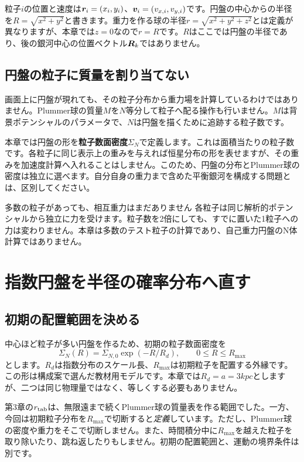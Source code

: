 粒子$i$の位置と速度は$\boldsymbol r_i=(x_i,y_i)$、$\boldsymbol v_i=(v_{x,i},v_{y,i})$です。円盤の中心からの半径を$R=\sqrt{x^2+y^2}$と書きます。重力を作る球の半径$r=\sqrt{x^2+y^2+z^2}$とは定義が異なりますが、本章では$z=0$なので$r=R$です。$R$はここでは円盤の半径であり、後の銀河中心の位置ベクトル$\boldsymbol R_k$ではありません。

\subsection{円盤の粒子に質量を割り当てない}
画面上に円盤が現れても、その粒子分布から重力場を計算しているわけではありません。Plummer球の質量$M$を$N$等分して粒子へ配る操作も行いません。$M$は背景ポテンシャルのパラメータで、$N$は円盤を描くために追跡する粒子数です。

本章では円盤の形を\textbf{粒子数面密度}$\Sigma_N$で定義します。これは面積当たりの粒子数です。各粒子に同じ表示上の重みを与えれば恒星分布の形を表せますが、その重みを加速度計算へ入れることはしません。このため、円盤の分布とPlummer球の密度は独立に選べます。自分自身の重力まで含めた平衡銀河を構成する問題とは、区別してください。

\begin{failbox}{多数の粒子があっても、相互重力はまだありません}
各粒子は同じ解析的ポテンシャルから独立に力を受けます。粒子数を2倍にしても、すでに置いた1粒子への力は変わりません。本章は多数のテスト粒子の計算であり、自己重力円盤のN体計算ではありません。
\end{failbox}

\section{指数円盤を半径の確率分布へ直す}
\label{sec:ch4-probability}
\subsection{初期の配置範囲を決める}
中心ほど粒子が多い円盤を作るため、初期の粒子数面密度を
\begin{equation}
\Sigma_N(R)=\Sigma_{N,0}\exp(-R/R_d),\qquad 0\le R\le R_{\max}
\label{eq:ch4-surface-density}
\end{equation}
とします。$R_d$は指数分布のスケール長、$R_{\max}$は初期粒子を配置する外縁です。この形は構成案で選んだ教材用モデルです。本章では$R_d=a=3\unit{kpc}$としますが、二つは同じ物理量ではなく、等しくする必要もありません。

第3章の$r_{\rm tab}$は、無限遠まで続くPlummer球の質量表を作る範囲でした。一方、今回は初期粒子分布を$R_{\max}$で切断すると\emph{定義}しています。ただし、Plummer球の密度や重力をそこで切断しません。また、時間積分中に$R_{\max}$を越えた粒子を取り除いたり、跳ね返したりもしません。初期の配置範囲と、運動の境界条件は別です。

